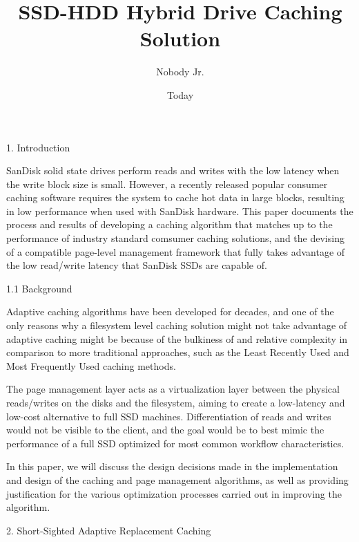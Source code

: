 \documentclass[11pt]{article}
\begin{document}
\title{SSD-HDD Hybrid Drive Caching Solution}
\author{Nobody Jr.}
\date{Today}
\maketitle

1. Introduction

SanDisk solid state drives perform reads and writes with the low latency when the write block size is small. However, a recently released popular consumer caching software requires the system to cache hot data in large blocks, resulting in low performance when used with SanDisk hardware. This paper documents the process and results of developing a caching algorithm that matches up to the performance of industry standard comsumer caching solutions, and the devising of a compatible page-level management framework that fully takes advantage of the low read/write latency that SanDisk SSDs are capable of.

1.1 Background

Adaptive caching algorithms have been developed for decades, and one of the only reasons why a filesystem level caching solution might not take advantage of adaptive caching might be because of the bulkiness of and relative complexity in comparison to more traditional approaches, such as the Least Recently Used and Most Frequently Used caching methods. 

The page management layer acts as a virtualization layer between the physical reads/writes on the disks and the filesystem, aiming to create a low-latency and low-cost alternative to full SSD machines. Differentiation of reads and writes would not be visible to the client, and the goal would be to best mimic the performance of a full SSD optimized for most common workflow characteristics.

In this paper, we will discuss the design decisions made in the implementation and design of the caching and page management algorithms, as well as providing justification for the various optimization processes carried out in improving the algorithm.

2. Short-Sighted Adaptive Replacement Caching
\end{document}
